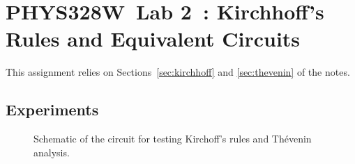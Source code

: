 \documentclass[11pt]{article}
\newcommand{\COURSE}{PHYS328W}
\newcommand{\LABNUM}{2}
\newcommand{\TITLE}{Kirchhoff's Rules and Equivalent Circuits}
\begin{document}
\thispagestyle{empty}

\section*{\COURSE\ Lab \LABNUM\ : \TITLE}

This assignment relies on Sections~\ref{sec:kirchhoff} and
\ref{sec:thevenin} of the notes.

\subsection*{Experiments}

\begin{figure}[h]
  \centering
  \caption{Schematic of the circuit for testing Kirchoff's rules and
    Th\'{e}venin analysis.} 
  \label{fig:thevenincircuit}
\end{figure}
\end{document}
